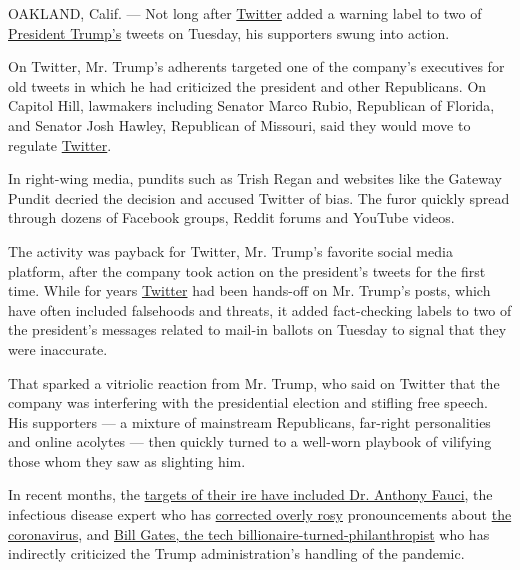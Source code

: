 OAKLAND, Calif. --- Not long after
\href{https://www.nytimes3xbfgragh.onion/2020/05/28/us/politics/trump-order-social-media.html}{Twitter}
added a warning label to two of
\href{https://www.nytimes3xbfgragh.onion/2020/05/28/us/politics/trump-order-social-media.html}{President
Trump's} tweets on Tuesday, his supporters swung into action.

On Twitter, Mr. Trump's adherents targeted one of the company's
executives for old tweets in which he had criticized the president and
other Republicans. On Capitol Hill, lawmakers including Senator Marco
Rubio, Republican of Florida, and Senator Josh Hawley, Republican of
Missouri, said they would move to regulate
\href{https://www.nytimes3xbfgragh.onion/2020/05/29/technology/trump-twitter.html}{Twitter}.

In right-wing media, pundits such as Trish Regan and websites like the
Gateway Pundit decried the decision and accused Twitter of bias. The
furor quickly spread through dozens of Facebook groups, Reddit forums
and YouTube videos.

The activity was payback for Twitter, Mr. Trump's favorite social media
platform, after the company took action on the president's tweets for
the first time. While for years
\href{https://www.nytimes3xbfgragh.onion/2020/05/29/technology/trump-twitter.html}{Twitter}
had been hands-off on Mr. Trump's posts, which have often included
falsehoods and threats, it added fact-checking labels to two of the
president's messages related to mail-in ballots on Tuesday to signal
that they were inaccurate.

That sparked a vitriolic reaction from Mr. Trump, who said on Twitter
that the company was interfering with the presidential election and
stifling free speech. His supporters --- a mixture of mainstream
Republicans, far-right personalities and online acolytes --- then
quickly turned to a well-worn playbook of vilifying those whom they saw
as slighting him.

In recent months, the
\href{https://www.nytimes3xbfgragh.onion/2020/03/28/technology/coronavirus-fauci-trump-conspiracy-target.html}{targets
of their ire have included Dr. Anthony Fauci}, the infectious disease
expert who has
\href{https://www.nytimes3xbfgragh.onion/2020/03/23/us/politics/coronavirus-trump-fauci.html}{corrected
overly rosy} pronouncements about
\href{https://www.nytimes3xbfgragh.onion/interactive/2020/world/coronavirus-maps.html}{the
coronavirus}, and
\href{https://www.nytimes3xbfgragh.onion/2020/04/17/technology/bill-gates-virus-conspiracy-theories.html}{Bill
Gates, the tech billionaire-turned-philanthropist} who has indirectly
criticized the Trump administration's handling of the pandemic.

